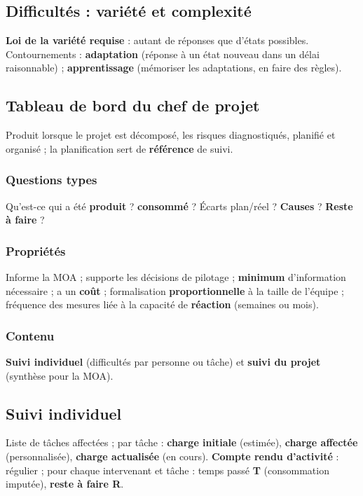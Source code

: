 \documentclass[11pt,a4paper]{article}
\begin{document}
\subsection{Difficultés : variété et complexité}
\textbf{Loi de la variété requise} : autant de réponses que d'états possibles. Contournements : \textbf{adaptation} (réponse à un état nouveau dans un délai raisonnable) ; \textbf{apprentissage} (mémoriser les adaptations, en faire des règles).

\subsection{Tableau de bord du chef de projet}
Produit lorsque le projet est décomposé, les risques diagnostiqués, planifié et organisé ; la planification sert de \textbf{référence} de suivi.

\subsubsection{Questions types}
Qu'est-ce qui a été \textbf{produit} ? \textbf{consommé} ? Écarts plan/réel ? \textbf{Causes} ? \textbf{Reste à faire} ?

\subsubsection{Propriétés}
Informe la MOA ; supporte les décisions de pilotage ; \textbf{minimum} d'information nécessaire ; a un \textbf{coût} ; formalisation \textbf{proportionnelle} à la taille de l'équipe ; fréquence des mesures liée à la capacité de \textbf{réaction} (semaines ou mois).

\subsubsection{Contenu}
\textbf{Suivi individuel} (difficultés par personne ou tâche) et \textbf{suivi du projet} (synthèse pour la MOA).

\subsection{Suivi individuel}
Liste de tâches affectées ; par tâche : \textbf{charge initiale} (estimée), \textbf{charge affectée} (personnalisée), \textbf{charge actualisée} (en cours). \textbf{Compte rendu d'activité} : régulier ; pour chaque intervenant et tâche : temps passé \textbf{T} (consommation imputée), \textbf{reste à faire R}.
\end{document}
